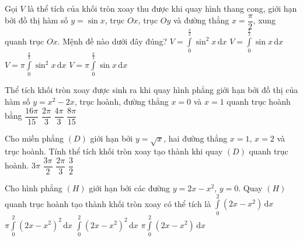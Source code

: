 	\begin{ex}%
		Gọi $V$ là thể tích của khối tròn xoay thu được khi quay hình thang cong, giới hạn bởi đồ thị hàm số $y=\sin x$, trục $Ox$, trục $Oy$ và đường thẳng $x=\dfrac{\pi}{2}$, xung quanh trục $Ox$. Mệnh đề nào dưới đây đúng?
		\choice
		{$V=\displaystyle\int\limits_0^{\tfrac{\pi}{2}}{\sin^2x\mathrm{\,d}x}$}
		{$V=\displaystyle\int\limits_0^{\tfrac{\pi}{2}}{\sin x\mathrm{\,d}x}$}
		{\True $V=\pi\displaystyle\int\limits_0^{\tfrac{\pi}{2}}{\sin^2x\mathrm{\,d}x}$}
		{$V=\pi\displaystyle\int\limits_0^{\tfrac{\pi}{2}}{\sin x\mathrm{\,d}x}$}
	\end{ex}

	\begin{ex}%
		Thể tích khối tròn xoay được sinh ra khi quay hình phẳng giới hạn bởi đồ thị của hàm số $y=x^2-2x$, trục hoành, đường thẳng $x=0$ và $x=1$ quanh trục hoành bằng
		\choice
		{$\dfrac{16\pi}{15}$}
		{$\dfrac{2\pi}{3}$}
		{$\dfrac{4\pi}{3}$}
		{\True $\dfrac{8\pi}{15}$}
	\end{ex}

	\begin{ex}%
		Cho miền phẳng $(D)$ giới hạn bởi $y=\sqrt x$, hai đường thẳng $x=1$, $x=2$ và trục hoành. Tính thể tích khối tròn xoay tạo thành khi quay $(D)$ quanh trục hoành.
		\choice
		{$3\pi $}
		{\True $\dfrac{3\pi}{2}$}
		{$\dfrac{2\pi}{3}$}
		{$\dfrac{3}{2}$}
	\end{ex}
	
	\begin{ex}%
		Cho hình phẳng $(H)$ giới hạn bởi các đường $y=2x-x^2$, $y=0$. Quay $(H)$ quanh trục hoành tạo thành khối tròn xoay có thể tích là
		\choice
		{$\displaystyle\int\limits_0^2\left(2x-x^2\right)\mathrm{\,d}x$}
		{\True $\pi\displaystyle\int\limits_0^2\left(2x-x^2\right)^2\mathrm{\,d}x$}
		{$\displaystyle\int\limits_0^2\left(2x-x^2\right)^2\mathrm{\,d}x$}
		{$\pi\displaystyle\int\limits_0^2\left(2x-x^2\right)\mathrm{\,d}x$}
	\end{ex}
	
